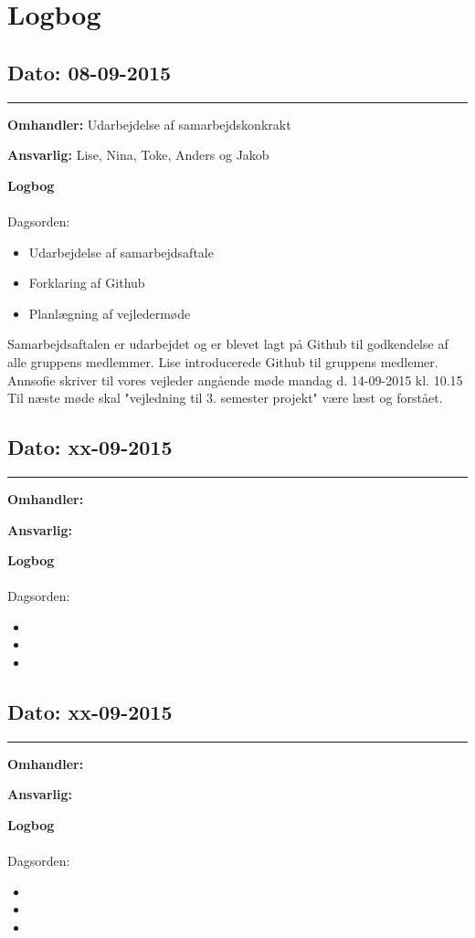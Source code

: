 \chapter{Logbog}

\section{Dato: 08-09-2015 }
\hrule

\textbf{Omhandler:} Udarbejdelse af samarbejdskonkrakt 

\textbf{Ansvarlig:} Lise, Nina, Toke, Anders og Jakob

\textbf{Logbog}
\\
\\
Dagsorden:
\begin{itemize}
	\item Udarbejdelse af samarbejdsaftale
	\item Forklaring af Github
	\item Planlægning af vejledermøde
\end{itemize}

Samarbejdsaftalen er udarbejdet og er blevet lagt på Github til godkendelse af alle gruppens medlemmer.\newline 
Lise introducerede Github til gruppens medlemer.\newline 
Annsofie skriver til vores vejleder angående møde mandag d. 14-09-2015 kl. 10.15\newline 
Til næste møde skal "vejledning til 3. semester projekt" være læst og forstået.\newline





\section{Dato: xx-09-2015 }
\hrule

\textbf{Omhandler:}

\textbf{Ansvarlig:}

\textbf{Logbog}
\\
\\
Dagsorden:
\begin{itemize}
	\item 
	\item 
	\item 
\end{itemize}




\section{Dato: xx-09-2015 }
\hrule

\textbf{Omhandler:}  

\textbf{Ansvarlig:} 

\textbf{Logbog}
\\
\\
Dagsorden:
\begin{itemize}
	\item 
	\item 
	\item 
\end{itemize}
